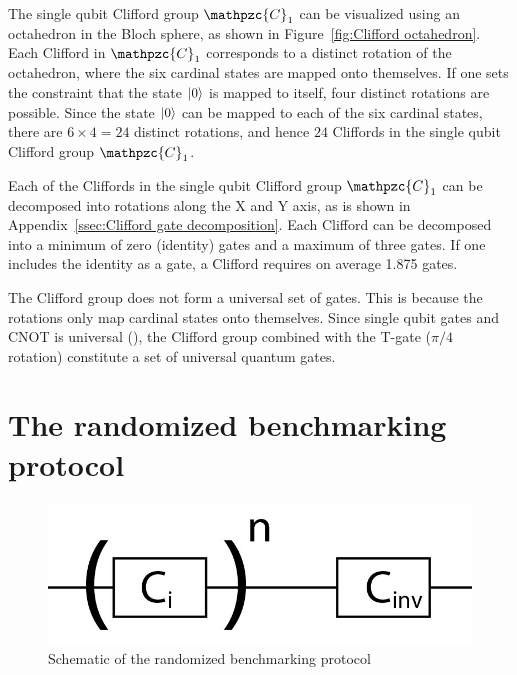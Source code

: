       The single qubit Clifford group $\mathpzc{C}_1$ can be visualized using an octahedron in the Bloch sphere, as shown in Figure~\ref{fig:Clifford octahedron}. Each Clifford in $\mathpzc{C}_1$ corresponds to a distinct rotation of the octahedron, where the six cardinal states are mapped onto themselves. If one sets the constraint that the state $\ket{0}$ is mapped to itself, four distinct rotations are possible. Since the state $\ket{0}$ can be mapped to each of the six cardinal states, there are $6 \times 4=24$ distinct rotations, and hence $24$ Cliffords in the single qubit Clifford group $\mathpzc{C}_1$.

      Each of the Cliffords in the single qubit Clifford group $\mathpzc{C}_1$ can be decomposed into rotations along the X and Y axis, as is shown in Appendix~\ref{ssec:Clifford gate decomposition}. Each Clifford can be decomposed into a minimum of zero (identity) gates and a maximum of three gates. If one includes the identity as a gate, a Clifford requires on average 1.875 gates.

      The Clifford group does not form a universal set of gates. This is because the rotations only map cardinal states onto themselves. Since single qubit gates and CNOT is universal (\cite{nielsen2010quantum}), the Clifford group combined with the T-gate ($\pi/4$ rotation) constitute a set of universal quantum gates.

    \section{The randomized benchmarking protocol}
      \label{sec:randomized benchmarking protocol}

      \begin{figure}
        \begin{center}
        \vspace{-30pt}
          \includegraphics[width=.8\textwidth]{../Figures/Randomized benchmarking/RB schematic.jpg}
        \end{center}
        \vspace{-20 pt}
        \caption{Schematic of the randomized benchmarking protocol}
        \label{fig:RB schematic}
      \end{figure}

